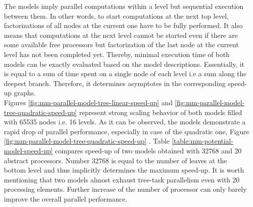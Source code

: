 


The models imply parallel computations within a  level but sequential execution between them. In other words, to start computations at the next top level, factorizations of all nodes at the current  one have to be fully performed. It also means that computations at the next level cannot be started  even if there are some available free processors but factorization of the last node at the current level has not been completed yet. Thereby, minimal execution time  of both models can be exactly evaluated based on the model descriptions. Essentially, it is equal to a sum of time spent on a single node of each level i.e a sum along the deepest branch. Therefore, it determines asymptotes in the corresponding speed-up graphs.\\



Figures \ref{fig:mm-parallel-model-tree-linear-speed-up} and \ref{fig:mm-parallel-model-tree-quadratic-speed-up} represent strong scaling behavior of both models filled with 65535 nodes i.e. 16 levels. As it can be observed, the models demonstrate a rapid drop of parallel performance, especially in case of the quadratic one, Figure \ref{fig:mm-parallel-model-tree-quadratic-speed-up} . Table \ref{table:mm-potential-model-speed-up} compares speed-up of two models obtained with 32768 and 20 abstract processors. Number 32768 is equal to the number of leaves at the bottom level and thus implicitly determines the maximum speed-up. It is worth mentioning that two models almost exhaust tree-task parallelism even with 20 processing elements. Further increase of the number of processor can only barely improve the overall parallel performance.\\


